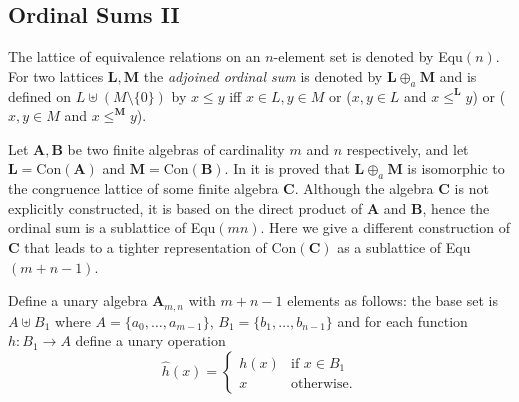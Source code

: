 \subsection{Ordinal Sums II}
\newcommand{\m}{\mathbf}

The lattice of equivalence relations on an $n$-element set is denoted by
Equ$(n)$. For two lattices $\m L,\m M$ the \emph{adjoined ordinal sum}  
is denoted by $\m L\oplus_a \m M$ and is defined on $L\uplus (M\setminus\{0\})$
by $x\le y$ iff $x\in L,y\in M$ or ($x,y\in L$ and $x\le^\m L y$) or ($x,y\in M$
and $x\le^\m M y$). 

Let $\m A,\m B$ be two finite algebras of cardinality $m$ and $n$ respectively,
and let $\m L=\text{Con}(\m A)$ and $\m M=\text{Con}(\m B)$. 
In \cite{Snow:2000} it is proved that $\m L\oplus_a\m M$ is isomorphic to the
congruence lattice of some finite algebra $\m C$. Although the algebra $\m C$ is
not explicitly constructed, it is based on the direct product of $\m A$ and $\m
B$, hence the ordinal sum is a sublattice of Equ$(mn)$. Here we give a different
construction of $\m C$ that leads to a tighter representation of Con$(\m C)$ as
a sublattice of Equ$(m+n-1)$.  

Define a unary algebra $\m A_{m,n}$ with $m+n-1$ elements as follows: 
the base set is $A\uplus B_1$ where $A=\{a_0,\dots,a_{m-1}\}$,
$B_1=\{b_1,\dots,b_{n-1}\}$ and for each function $h:B_1\to A$ define a unary
operation 
$$\hat h(x)=\begin{cases}h(x)&\text{if $x\in B_1$}\\ 
x&\text{otherwise.}\end{cases}$$

